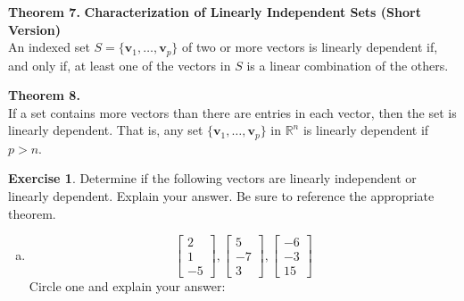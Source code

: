 \documentclass[10pt]{book}
\newcommand{\boxcolor}{gray!30}
\newenvironment{boxthm}{\begin{mdframed}[backgroundcolor=\boxcolor,nobreak=true]}{\end{mdframed}}
\theoremstyle{definition}
\newtheorem{exercise}{Exercise}[section]
\newcommand{\R}{\mathbb{R}}
\newcommand{\vect}[1]{\ensuremath{\boldsymbol{\mathbf{#1}}}}
\begin{document}
\begin{boxthm}
	\textbf{Theorem 7.}
	\textbf{Characterization of Linearly Independent Sets (Short Version)} \\
	An indexed set $S=\{\vect{v}_1,\ldots,\vect{v}_p\}$ of two or more vectors is linearly dependent if, and only if, at least one of the vectors in $S$ is a linear combination of the others.
\end{boxthm}
\begin{boxthm}
	\textbf{Theorem 8.} \\
	If a set contains more vectors than there are entries in each vector, then the set is linearly dependent. That is, any set $\{\vect{v}_1,\ldots,\vect{v}_p\}$ in $\R^n$ is linearly dependent if $p>n$.
\end{boxthm}
\begin{exercise} %
	Determine if the following vectors are linearly independent or linearly dependent. Explain your answer. Be sure to reference the appropriate theorem.
		\begin{multicols}{2}
			\begin{enumerate}[(a)]
				\item
					$$
					\begin{bmatrix} 2\\1\\-5 \end{bmatrix},
					\begin{bmatrix} 5\\-7\\3 \end{bmatrix},
					\begin{bmatrix} -6\\-3\\15 \end{bmatrix}
					$$
					Circle one and explain your answer:
					\begin{center}
						 \qquad
					\end{center}
				
				\columnbreak
				

\end{enumerate}
\end{multicols}
\end{exercise}
\end{document}

